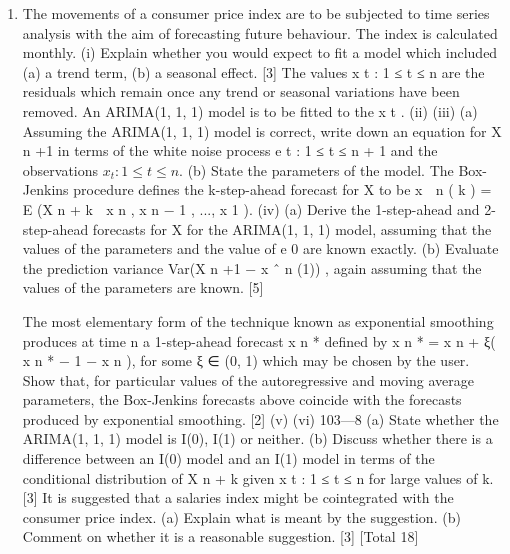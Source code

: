 \documentclass[a4paper,12pt]{article}
\begin{document}
\begin{enumerate}

\item 
The movements of a consumer price index are to be subjected to time series analysis with the aim of forecasting future behaviour. The index is calculated monthly.
(i)
Explain whether you would expect to fit a model which included (a) a trend term, (b) a seasonal effect.
[3]
The values {x t : 1 ≤ t ≤ n} are the residuals which remain once any trend or seasonal variations have been removed. An ARIMA(1, 1, 1) model is to be fitted to the {x t }.
(ii)
(iii)
(a) Assuming the ARIMA(1, 1, 1) model is correct, write down an equation for X n +1 in terms of the white noise process
{e t : 1 ≤ t ≤ n + 1} and the observations ${x_t : 1 \leq t \leq n}$.
(b) State the parameters of the model.
The Box-Jenkins procedure defines the k-step-ahead forecast for X to be x  n ( k ) = E (X n + k  x n , x n − 1 , ..., x 1 ).
(iv)
(a) Derive the 1-step-ahead and 2-step-ahead forecasts for X for the ARIMA(1, 1, 1) model, assuming that the values of the parameters
and the value of e 0 are known exactly.
(b) Evaluate the prediction variance Var(X n +1 − x ˆ n (1)) , again assuming that the values of the parameters are known.
[5]


The most elementary form of the technique known as exponential smoothing produces at time n a 1-step-ahead forecast x n * defined by x n * = x n + ξ( x n * − 1 − x n ),
for some ξ ∈ (0, 1) which may be chosen by the user.
Show that, for particular values of the autoregressive and moving average parameters, the Box-Jenkins forecasts above coincide with the forecasts produced by exponential smoothing.
[2]
(v)
(vi)
103—8
(a) State whether the ARIMA(1, 1, 1) model is I(0), I(1) or neither.
(b) Discuss whether there is a difference between an I(0) model and an I(1) model in terms of the conditional distribution of X n + k given {x t : 1 ≤ t ≤ n} for large values of k. [3]
It is suggested that a salaries index might be cointegrated with the consumer price index.
(a) Explain what is meant by the suggestion.
(b) Comment on whether it is a reasonable suggestion.
[3]
[Total 18]





\end{enumerate}
\end{document}
